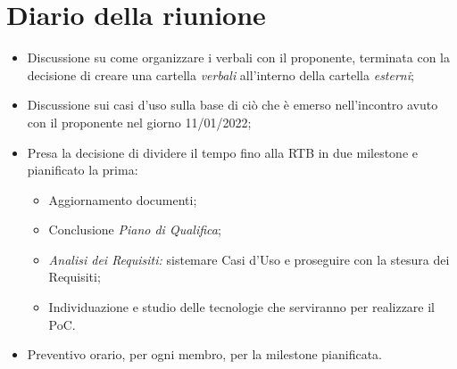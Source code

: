 \section{Diario della riunione}
\begin{itemize}
  \item Discussione su come organizzare i verbali con il proponente, terminata con la decisione di creare una cartella \textit{verbali} all'interno della cartella \textit{esterni};
  \item Discussione sui casi d'uso sulla base di ciò che è emerso nell'incontro avuto con il proponente nel giorno 11/01/2022;
  \item Presa la decisione di dividere il tempo fino alla RTB in due milestone e pianificato la prima:
    \begin{itemize}
      \item Aggiornamento documenti;
      \item Conclusione \textit{Piano di Qualifica};
      \item \textit{Analisi dei Requisiti:} sistemare Casi d'Uso e proseguire con la stesura dei Requisiti;
      \item Individuazione e studio delle tecnologie che serviranno per realizzare il PoC.
    \end{itemize}
  \item Preventivo orario, per ogni membro, per la milestone pianificata. 
\end{itemize}
